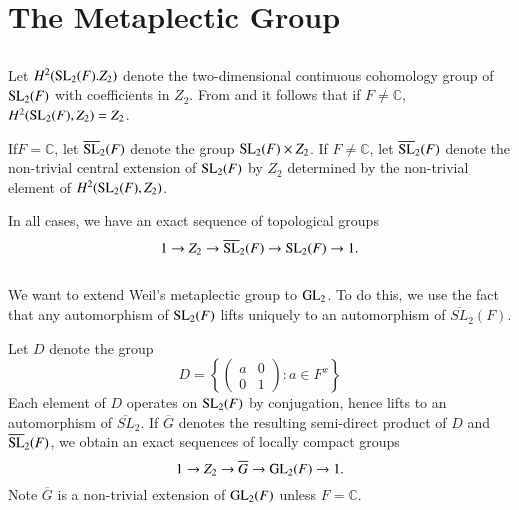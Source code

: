 \section{The Metaplectic Group}\label{art1-sec1}

\subsection{}\label{art1-sec1.1} Let $H^{2}(\mathrm{SL}_{2}(F).Z_{2})$ denote the two-dimensional continuous cohomology group of $\mathrm{SL}_{2}(F)$ with coefficients in $Z_{2}$. From \cite{Weil} and \cite{Moore} it follows that if $F\neq \mathbb{C}$, $H^{2}(\mathrm{SL}_{2}(F),Z_{2})=Z_{2}$.

If\pageoriginale $F=\mathbb{C}$, let $\overline{\mathrm{SL}}_{2}(F)$ denote the group $\mathrm{SL}_{2}(F)\times Z_{2}$. If $F\neq \mathbb{C}$, let $\overline{\mathrm{SL}}_{2}(F)$ denote the non-trivial central extension of $\mathrm{SL}_{2}(F)$ by $Z_{2}$ determined by the non-trivial element of $H^{2}(\mathrm{SL}_{2}(F),Z_{2})$.

In all cases, we have an exact sequence of topological groups
$$
1\to Z_{2}\to \overline{\mathrm{SL}}_{2}(F)\to \mathrm{SL}_{2}(F)\to 1.
$$

\subsection{}\label{art1-sec1.2}
We want to extend Weil's metaplectic group to $\mathrm{GL}_{2}$. To do this, we use the fact that any automorphism of $\mathrm{SL}_{2}(F)$ lifts uniquely to an automorphism of $\overline{SL}_{2}(F)$.

Let $D$ denote the group
$$
D=\left\{\left(\begin{matrix} a & 0\\ 0 & 1\end{matrix}\right): a\in F^{x}\right\}
$$
Each element of $D$ operates on $\mathrm{SL}_{2}(F)$ by conjugation, hence lifts to an automorphism of $\overline{SL}_{2}$. If $\overline{G}$ denotes the resulting semi-direct product of $D$ and $\overline{\mathrm{SL}}_{2}(F)$, we obtain an exact sequences of locally compact groups
\begin{equation}
1\to Z_{2}\to \overline{G}\to \mathrm{GL}_{2}(F)\to 1.\label{art1-eq1.2.1}
\end{equation}
Note $\overline{G}$ is a non-trivial extension of $\mathrm{GL}_{2}(F)$ unless $F=\mathbb{C}$.

